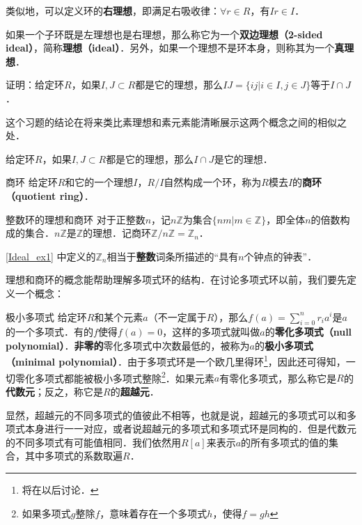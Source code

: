 类似地，可以定义环的\textbf{右理想}，即满足右吸收律：$\forall r\in R$，有$Ir\in I$．

如果一个子环既是左理想也是右理想，那么称它为一个\textbf{双边理想（2-sided ideal）}，简称\textbf{理想（ideal）}．另外，如果一个理想不是环本身，则称其为一个\textbf{真理想}．

\begin{exercise}{}
证明：给定环$R$，如果$I, J\subset R$都是它的理想，那么$IJ=\{ij|i\in I, j\in J\}$等于$I\cap J$．
\end{exercise}

这个习题的结论在将来类比素理想和素元素能清晰展示这两个概念之间的相似之处．

\begin{theorem}{}
给定环$R$，如果$I, J\subset R$都是它的理想，那么$I\cap J$是它的理想．
\end{theorem}


\begin{definition}{商环}
给定环$R$和它的一个理想$I$，$R/I$自然构成一个环，称为$R$模去$I$的\textbf{商环（quotient ring）}．
\end{definition}


\begin{example}{整数环的理想和商环}\label{Ideal_ex1}
对于正整数$n$，记$n\mathbb{Z}$为集合$\{nm|m\in\mathbb{Z}\}$，即全体$n$的倍数构成的集合．$n\mathbb{Z}$是$\mathbb{Z}$的理想．记商环$\mathbb{Z}/n\mathbb{Z}=\mathbb{Z}_n$．
\end{example}

\autoref{Ideal_ex1} 中定义的$\mathbb{Z}_n$相当于\textbf{整数}词条所描述的“具有$n$个钟点的钟表”．


理想和商环的概念能帮助理解多项式环的结构．在讨论多项式环以前，我们要先定义一个概念：

\begin{definition}{极小多项式}
给定环$R$和某个元素$a$（不一定属于$R$），那么$f(a)=\sum\limits^{n}_{i=0}r_ia^i$是$a$的一个多项式．有的$f$使得$f(a)=0$，这样的多项式就叫做$a$的\textbf{零化多项式（null polynomial）}．\textbf{非零的}零化多项式中次数最低的，被称为$a$的\textbf{极小多项式（minimal polynomial）}．由于多项式环是一个欧几里得环\footnote{将在以后讨论．}，因此还可得知，一切零化多项式都能被极小多项式整除\footnote{如果多项式$g$整除$f$，意味着存在一个多项式$h$，使得$f=gh$}．如果元素$a$有零化多项式，那么称它是$R$的\textbf{代数元}；反之，称它是$R$的\textbf{超越元}．
\end{definition}

显然，超越元的不同多项式的值彼此不相等，也就是说，超越元的多项式可以和多项式本身进行一一对应，或者说超越元的多项式和多项式环是同构的．但是代数元的不同多项式有可能值相同．我们依然用$R[a]$来表示$a$的所有多项式的值的集合，其中多项式的系数取遍$R$．

